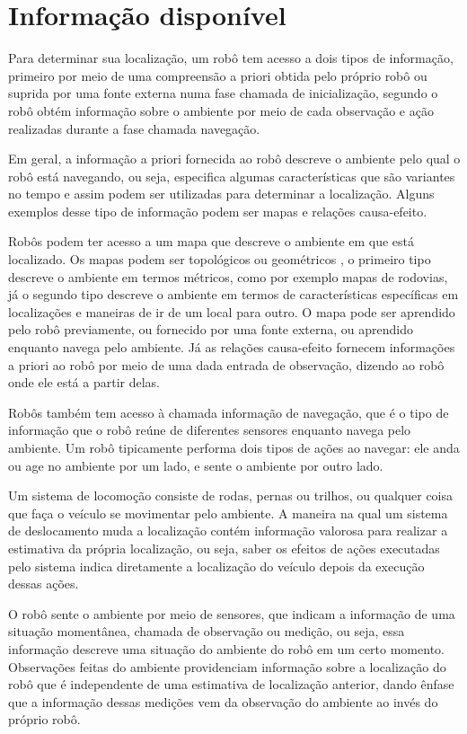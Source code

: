 \documentclass[acronym, symbols, table]{fei}
\begin{document}
		\section{Informação disponível}
			
			Para determinar sua localização, um robô tem acesso a dois tipos de informação, primeiro por meio de uma compreensão a priori obtida pelo próprio robô ou suprida por uma fonte externa numa fase chamada de inicialização, segundo o robô obtém informação sobre o ambiente por meio de cada observação e ação realizadas durante a fase chamada navegação. 
			
			Em geral, a informação a priori fornecida ao robô descreve o ambiente pelo qual o robô está navegando, ou seja, especifica algumas características que são variantes no tempo e assim podem ser utilizadas para determinar a localização. Alguns exemplos desse tipo de informação podem ser mapas e relações causa-efeito.
			
			Robôs podem ter acesso a um mapa que descreve o ambiente em que está localizado. Os mapas podem ser topológicos ou geométricos \cite{mendes2017perceccao}, o primeiro tipo descreve o ambiente em termos métricos, como por exemplo mapas de rodovias, já o segundo tipo descreve o ambiente em termos de características específicas em localizações e maneiras de ir de um local para outro. O mapa pode ser aprendido pelo robô previamente, ou fornecido por uma fonte externa, ou aprendido enquanto navega pelo ambiente. Já as relações causa-efeito fornecem informações a priori ao robô por meio de uma dada entrada de observação, dizendo ao robô onde ele está a partir delas.
			
			Robôs também tem acesso à chamada informação de navegação, que é o tipo de informação que o robô reúne de diferentes sensores enquanto navega pelo ambiente. Um robô tipicamente performa dois tipos de ações ao navegar: ele anda ou age no ambiente por um lado, e sente o ambiente por outro lado.
			
			Um sistema de locomoção consiste de rodas, pernas ou trilhos, ou qualquer coisa que faça o veículo se movimentar pelo ambiente. A maneira na qual um sistema de deslocamento muda a localização contém informação valorosa para realizar a estimativa da própria localização, ou seja, saber os efeitos de ações executadas pelo sistema indica diretamente a localização do veículo depois da execução dessas ações.
			
			O robô sente o ambiente por meio de sensores, que indicam a informação de uma situação momentânea, chamada de observação ou medição, ou seja, essa informação descreve uma situação do ambiente do robô em um certo momento. Observações feitas do ambiente providenciam informação sobre a localização do robô que é independente de uma estimativa de localização anterior, dando ênfase que a informação dessas medições vem da observação do ambiente ao invés do próprio robô.
	
\end{document}
